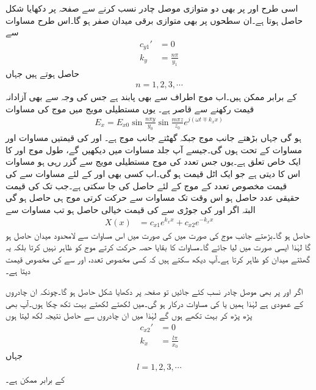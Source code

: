 اسی طرح  اور  پر بھی دو متوازی موصل چادر نسب کرنے سے صفحہ  پر دکھایا شکل  حاصل ہوتا ہے۔ان سطحوں پر بھی متوازی برقی میدان صفر ہو گا۔اس طرح مساوات  سے
\begin{align}
c_{y1}'&=0\\
k_y &=\frac{n \pi}{y_1}\label{مساوات_مویج_میکس_ویل_عمومی_مستطیلی_شرط_ب}
\end{align}
حاصل ہوتے ہیں جہاں
\begin{align}
n=1,2,3,\cdots
\end{align}
کے برابر ممکن ہیں۔اب موج  اطراف سے بھی  پابند ہے جس کی وجہ سے  بھی آزادانہ قیمت رکھنے سے قاصر ہے۔ یوں مستطیلی مویج میں موج کی مساوات 
\begin{align}
E_x=E_{x0} \sin \frac{n\pi y}{y_0} \sin \frac{m\pi z}{z_0} e^{j(\omega t \mp k_x x)}
\end{align}
ہو گی جہاں  بڑھتے  جانب موج جبکہ  گھٹتے  جانب موج ہے۔  اور  کی قیمتیں مساوات  اور مساوات  کے تحت ہوں گی۔جیسے آپ جلد مساوات  میں دیکھیں گے، طول موج اور  کا ایک خاص تعلق ہے۔یوں جس تعدد کی موج مستطیلی مویج سے گزر رہی ہو مساوات  اس کا  دیتی ہے جو ایک  اٹل قیمت ہو گی۔اب کسی بھی  اور  کے لئے مساوات  سے  کی قیمت مخصوص تعدد کے موج کے لئے حاصل کی جا سکتی ہے۔جب تک  کی قیمت حقیقی عدد حاصل ہو اس وقت تک مساوات  سے  حرکت کرتی موج ہی حاصل ہو گی البتہ اگر   اور  کی جوڑی سے  کی قیمت خیالی حاصل ہو تب مساوات    سے
\begin{align*}
X(x)&=c_{x1}e^{k_x x}+c_{x2}e^{ - k_x x} 
\end{align*}
حاصل ہو گا۔بڑھتے  جانب موج  کی صورت میں  کی صورت میں اس مساوات سے لامحدود میدان حاصل ہو گا لہٰذا ایسی صورت میں  لیا جائے گا۔مساوات کا بقایا حصہ حرکت کرتے موج کو ظاہر نہیں کرتا بلکہ یہ گھٹتے میدان کو ظاہر کرتا ہے۔آپ دیکھ سکتے ہیں کہ کسی مخصوص تعدد،  اور  سے   کی مخصوص قیمت دیتا ہے۔ 

اگر  اور  پر بھی موصل چادر نسب کئے جائیں تو صفحہ  پر دکھایا شکل  حاصل ہو گا۔چونکہ  ان چادروں کے عمودی ہے لہٰذا ہمیں  یا  کی مساوات درکار ہو گی۔میں لکھتے لکھتے بہت تکھ  چکا ہوں۔آپ بھی پڑھ پڑھ کر بہت تکھے ہوں گے لہٰذا میں ان چادروں سے حاصل نتیجہ لکھ لیتا ہوں
\begin{align}
c_{x2}'&=0\\
k_x&=\frac{l\pi}{x_0}
\end{align} 
جہاں
\begin{align}
l=1,2,3,\cdots
\end{align}
کے برابر ممکن ہے۔

